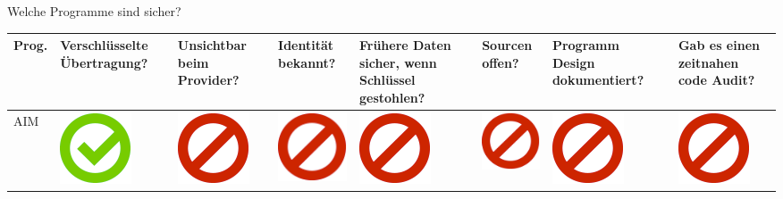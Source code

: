 \documentclass[final]{beamer}
\newlength{\twocolwid}
\begin{document}
\begin{frame}[t]
\begin{columns}[t, totalwidth=\textwidth]
\begin{column}{\twocolwid}
\begin{block}{Welche Programme sind sicher?}
\begin{tabular}{ l | C{4cm} | C{4cm} | C{4cm} | C{4.5cm} | C{4cm} | C{5cm} | C{3cm} | }
Prog. & Ver\-schlüs\-sel\-te Übertragung? & Unsichtbar beim Provider? & Identität bekannt? & Frühere Daten sicher, wenn Schlüssel gestohlen? & Sourcen offen? & Programm Design dokumentiert? & Gab es einen zeitnahen code Audit? \tabularnewline
\hline
AIM & \includegraphics[scale=0.5]{pics/haken.png} & \includegraphics[scale=0.5]{pics/nohaken.png} & \includegraphics[scale=0.5]{pics/nohaken.png} & \includegraphics[scale=0.5]{pics/nohaken.png} & \includegraphics[scale=0.5]{pics/nohaken.png} & \includegraphics[scale=0.5]{pics/nohaken.png} & \includegraphics[scale=0.5]{pics/nohaken.png} \tabularnewline[0.5ex]

\end{tabular}
\end{block}
\end{column}
\end{columns}
\end{frame}
\end{document}
